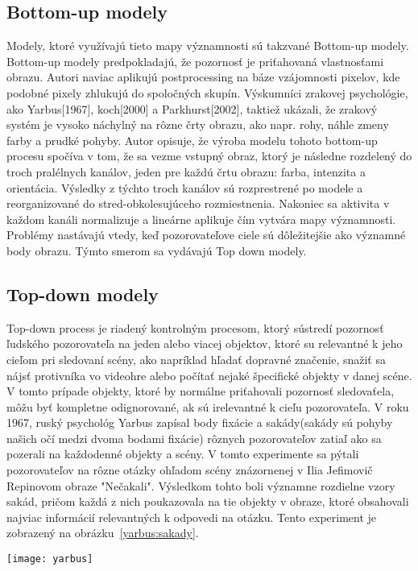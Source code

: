 \documentclass[10pt,twoside,slovak,a4paper]{article}
\begin{document}
\subsection{Bottom-up modely} \label{ina}
Modely, ktoré využívajú tieto mapy významnosti sú takzvané Bottom-up modely. Bottom-up modely predpokladajú, že pozornosť je priťahovaná vlastnosťami obrazu. Autori\cite{bottom} naviac aplikujú postprocessing na báze vzájomnosti pixelov, kde podobné pixely zhlukujú do spoločných skupín. Výskumníci zrakovej psychológie, ako Yarbus[1967], koch[2000] a Parkhurst[2002], taktiež ukázali, že zrakový systém je vysoko náchylný na rôzne črty obrazu, ako napr. rohy, náhle zmeny farby a prudké pohyby. Autor\cite{saliency:vytvar} opisuje, že výroba modelu tohoto bottom-up procesu spočíva v tom, že sa vezme vstupný obraz, ktorý je následne rozdelený do troch pralélnych kanálov, jeden pre každú črtu obrazu: farba, intenzita a orientácia. Výsledky z týchto troch kanálov sú rozprestrené po modele a reorganizované do stred-obkolesujúceho rozmiestnenia. Nakoniec sa aktivita v každom kanáli normalizuje a lineárne aplikuje čím vytvára mapy významnosti. Problémy nastávajú vtedy, keď pozorovateľove ciele sú dôležitejšie ako významné body obrazu. Týmto smerom sa vydávajú Top down modely.    
\subsection{Top-down modely} \label{nejaka}
Top-down process je riadený kontrolným procesom, ktorý sústredí pozornosť ľudského pozorovateľa na jeden alebo viacej objektov, ktoré su relevantné k jeho cieľom pri sledovaní scény, ako napríklad hľadať dopravné značenie, snažiť sa nájsť  protivníka vo videohre alebo počítať nejaké špecifické objekty v danej scéne. V tomto prípade objekty, ktoré by normálne priťahovali pozornosť sledovaťela, môžu byť kompletne odignorované, ak sú irelevantné k cieľu pozorovateľa. V roku 1967, ruský psychológ Yarbus zapísal body fixácie a sakády(sakády sú pohyby našich očí medzi dvoma bodami fixácie) rôznych pozorovateľov zatiaľ ako sa pozerali na každodenné objekty a scény. V tomto experimente sa pýtali pozorovateľov na rôzne otázky ohľadom scény znázornenej v Ilia Jefimovič Repinovom  obraze "Nečakali". Výsledkom tohto boli významne rozdielne vzory sakád, pričom každá z nich poukazovala na tie objekty v obraze, ktoré obsahovali najviac informácií relevantných k odpovedi na otázku. Tento experiment je zobrazený na obrázku~\ref{yarbus:sakady}.
\begin{figure*}[tbh]
\centering
\texttt{[image: yarbus]}
\caption{ Dopad úloh na pohyb očí. Repinov obraz bol pozorovaný subjektami s rozlišnými inštrukciami(obrázky idú v poradí z ľava do prava z hora dole):1. Voľné pozorovanie, 2. Odhadnite ich vek, 3. Zistite čo robili pred tým ako sa ukázal nečakaný hosť, 4. Zapamätajte si oblečenie ktoré majú na sebe postavy oblečené, 5. Zapamätajte si pozíciu ľudí a objektov v izbe a 6. Predpovedajte, ako dlho bol nečakaný hosť preč od danej rodiny[Yarbus 1967].}
\label{yarbus:sakady}
\end{figure*}
\end{document}

